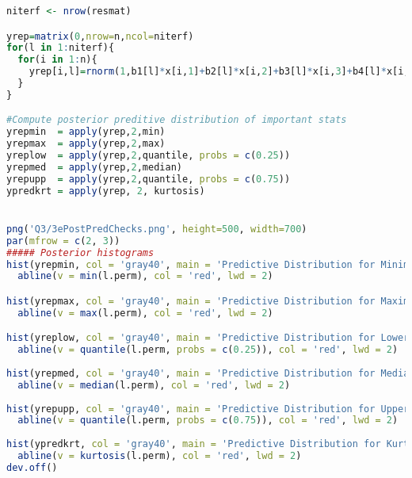\documentclass{article}
\begin{document}
\begin{lstlisting}[language=R]
niterf <- nrow(resmat)

yrep=matrix(0,nrow=n,ncol=niterf)
for(l in 1:niterf){
  for(i in 1:n){
    yrep[i,l]=rnorm(1,b1[l]*x[i,1]+b2[l]*x[i,2]+b3[l]*x[i,3]+b4[l]*x[i,4],sigma[l])
  }
}

#Compute posterior preditive distribution of important stats
yrepmin  = apply(yrep,2,min)
yrepmax  = apply(yrep,2,max)
yreplow  = apply(yrep,2,quantile, probs = c(0.25))
yrepmed  = apply(yrep,2,median)
yrepupp  = apply(yrep,2,quantile, probs = c(0.75))
ypredkrt = apply(yrep, 2, kurtosis)


png('Q3/3ePostPredChecks.png', height=500, width=700)
par(mfrow = c(2, 3))
##### Posterior histograms
hist(yrepmin, col = 'gray40', main = 'Predictive Distribution for Minimum')
  abline(v = min(l.perm), col = 'red', lwd = 2)

hist(yrepmax, col = 'gray40', main = 'Predictive Distribution for Maximum')
  abline(v = max(l.perm), col = 'red', lwd = 2)

hist(yreplow, col = 'gray40', main = 'Predictive Distribution for Lower Quartile')
  abline(v = quantile(l.perm, probs = c(0.25)), col = 'red', lwd = 2)
  
hist(yrepmed, col = 'gray40', main = 'Predictive Distribution for Median')
  abline(v = median(l.perm), col = 'red', lwd = 2)
  
hist(yrepupp, col = 'gray40', main = 'Predictive Distribution for Upper Quartile')
  abline(v = quantile(l.perm, probs = c(0.75)), col = 'red', lwd = 2)
  
hist(ypredkrt, col = 'gray40', main = 'Predictive Distribution for Kurtosis')
  abline(v = kurtosis(l.perm), col = 'red', lwd = 2)
dev.off()
\end{lstlisting}
\end{document}
